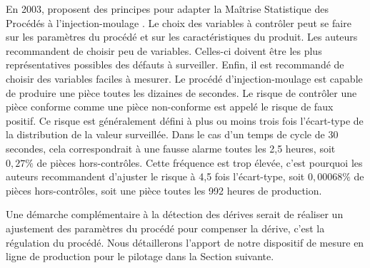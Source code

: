 En 2003, \citeauthor{pillet_maitrise_2003} proposent des principes pour adapter la Maîtrise Statistique des Procédés à l'injection-moulage \cite{pillet_maitrise_2003}.
Le choix des variables à contrôler peut se faire sur les paramètres du procédé et sur les caractéristiques du produit.
Les auteurs recommandent de choisir peu de variables.
Celles-ci doivent être les plus représentatives possibles des défauts à surveiller.
Enfin, il est recommandé de choisir des variables faciles à mesurer.
Le procédé d'injection-moulage est capable de produire une pièce toutes les dizaines de secondes.
Le risque de contrôler une pièce conforme comme une pièce non-conforme est appelé le risque de faux positif.
Ce risque est généralement défini à plus ou moins trois fois l'écart-type de la distribution de la valeur surveillée.
Dans le cas d'un temps de cycle de 30 secondes, cela correspondrait à une fausse alarme toutes les 2,5 heures, soit $0,27\%$ de pièces hors-contrôles.
Cette fréquence est trop élevée, c'est pourquoi les auteurs recommandent d'ajuster le risque à 4,5 fois l'écart-type, soit $0,00068\%$ de pièces hors-contrôles, soit une pièce toutes les 992 heures de production.

Une démarche complémentaire à la détection des dérives serait de réaliser un ajustement des paramètres du procédé pour compenser la dérive, c'est la régulation du procédé.
Nous détaillerons l'apport de notre dispositif de  mesure en ligne de production pour le pilotage dans la Section suivante.




